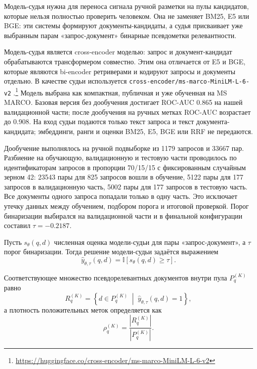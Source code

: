 \documentclass[runningheads,a4paper]{llncs}
\begin{document}
Модель-судья нужна для переноса сигнала ручной разметки на пулы кандидатов, которые нельзя полностью проверить человеком. Она не заменяет BM25, E5 или BGE: эти системы формируют документы-кандидаты, а судья присваивает уже выбранным парам «запрос-документ» бинарные псевдометки релевантности.

Модель-судья является cross-encoder моделью: запрос и документ-кандидат обрабатываются трансформером совместно. Этим она отличается от E5 и BGE, которые являются bi-encoder ретриверами и кодируют запросы и документы отдельно. В качестве судьи используется \texttt{cross-encoder/ms-marco-MiniLM-L-6-v2} \cite{wang2020minilm,reimers2019sentencebert}.\footnote{\url{https://huggingface.co/cross-encoder/ms-marco-MiniLM-L-6-v2}} Модель выбрана как компактная, публичная и уже обученная на MS MARCO. Базовая версия без дообучения достигает ROC-AUC 0.865 на нашей валидационной части; после дообучения на ручных метках ROC-AUC возрастает до 0.908. На вход судьи подаются только текст запроса и текст документа-кандидата; эмбеддинги, ранги и оценки BM25, E5, BGE или RRF не передаются.

Дообучение выполнялось на ручной подвыборке из 1179 запросов и 33667 пар. Разбиение на обучающую, валидационную и тестовую части проводилось по идентификаторам запросов в пропорции 70/15/15 с фиксированным случайным зерном 42: 23543 пары для 825 запросов вошли в обучение, 5122 пары для 177 запросов \textemdash{} в валидационную часть, 5002 пары для 177 запросов \textemdash{} в тестовую часть. Все документы одного запроса попадали только в одну часть. Это исключает утечку данных между обучением, подбором порога и итоговой проверкой. Порог бинаризации выбирался на валидационной части и в финальной конфигурации составил $\tau = -0.2187$.

Пусть $s_\theta(q,d)$ \textemdash{} численная оценка модели-судьи для пары «запрос-документ», а $\tau$ \textemdash{} порог бинаризации. Тогда решение модели-судьи задаётся выражением
\begin{equation}
\label{eq:judge}
\hat y_{\theta,\tau}(q,d) = \mathbb{I}\left[s_\theta(q,d) \ge \tau\right].
\end{equation}

Соответствующее множество псевдорелевантных документов внутри пула $P_q^{(K)}$ равно
\begin{equation}
\label{eq:positive-set}
R_q^{(K)} = \left\{ d \in P_q^{(K)} \; \middle| \; \hat y_{\theta,\tau}(q,d) = 1 \right\},
\end{equation}
а плотность положительных меток определяется как
\begin{equation}
\label{eq:density}
\rho_q^{(K)} = \frac{|R_q^{(K)}|}{|P_q^{(K)}|}.
\end{equation}
\end{document}
